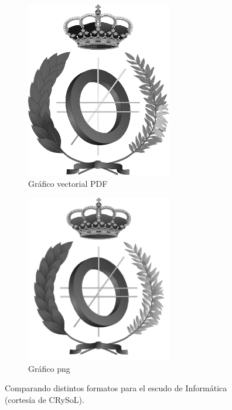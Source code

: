 \documentclass[11pt,a4paper]{article}
\begin{document}
\begin{figure}[H]
	\centering
	\begin{subfigure}[b]{0.3\textwidth}
		\centering
		\includegraphics[width=0.7\textwidth]{../figs/escudoInfBW.pdf}
		\caption{Gráfico vectorial \textsf{PDF}}\label{fig:escudoPDF}
	\end{subfigure}
	\begin{subfigure}[b]{0.3\textwidth}
		\centering
		\includegraphics[width=0.7\textwidth]{../figs/escudoInfBW.png}
		\caption{Gráfico png}\label{fig:escudoPNG}
	\end{subfigure}
	\caption[Comparación \textsf{PDF} y png]{Comparando distintos formatos para el escudo de Informática (cortesía de CRySoL).}
	\label{fig:escudo}
\end{figure}
\end{document}
